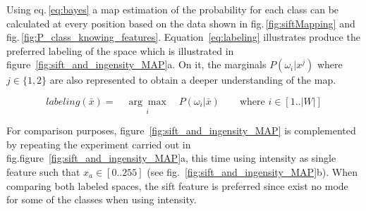 \documentclass[a4paper, 10pt, conference]{llncs}      %
\begin{document}
Using eq.\,\ref{eq:bayes} a \ac{map} estimation of the probability for each class can be calculated at every position based on the data shown in fig.\,\ref{fig:siftMapping} and fig.\,\ref{fig:P_class_knowing_features}.
Equation~\ref{eq:labeling} illustrates produce the preferred labeling of the space which is illustrated in figure~\ref{fig:sift_and_ingensity_MAP}a. On it, the marginals $P(\omega_i|x^j)$ where $j\in \{1,2\}$ are also represented to obtain a deeper understanding of the \ac{map}.

\begin{equation}
labeling(\bar{x}) = \quad\underset{i}{\arg\max}\quad P(\omega_i|\bar{x})
\label{eq:labeling} \qquad \text{where } i \in [1 .. |W|] 
\end{equation}

For comparison purposes, figure~\ref{fig:sift_and_ingensity_MAP} is complemented by repeating the experiment carried out in fig.figure~\ref{fig:sift_and_ingensity_MAP}a, this time using intensity as single feature such that $x_a \in [0 .. 255]$ (see fig.~\ref{fig:sift_and_ingensity_MAP}b). When comparing both labeled spaces, the \ac{sift} feature is preferred since exist no mode for some of the classes when using intensity.


\end{document}
